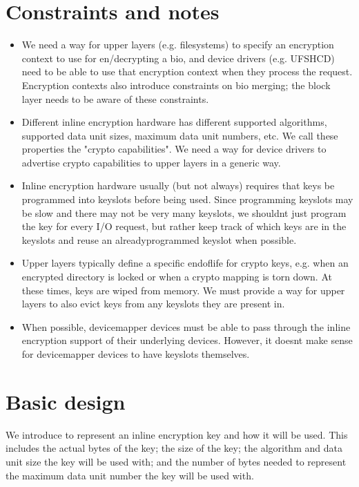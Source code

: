 \documentclass[a4paper,11pt,english]{sphinxmanual}
\begin{document}
\section{Constraints and notes}
\label{\detokenize{inline-encryption:constraints-and-notes}}\begin{itemize}
\item {} 
We need a way for upper layers (e.g. filesystems) to specify an encryption
context to use for en/decrypting a bio, and device drivers (e.g. UFSHCD) need
to be able to use that encryption context when they process the request.
Encryption contexts also introduce constraints on bio merging; the block layer
needs to be aware of these constraints.

\item {} 
Different inline encryption hardware has different supported algorithms,
supported data unit sizes, maximum data unit numbers, etc.  We call these
properties the "crypto capabilities".  We need a way for device drivers to
advertise crypto capabilities to upper layers in a generic way.

\item {} 
Inline encryption hardware usually (but not always) requires that keys be
programmed into keyslots before being used.  Since programming keyslots may be
slow and there may not be very many keyslots, we shouldn\textquotesingle{}t just program the
key for every I/O request, but rather keep track of which keys are in the
keyslots and reuse an already\sphinxhyphen{}programmed keyslot when possible.

\item {} 
Upper layers typically define a specific end\sphinxhyphen{}of\sphinxhyphen{}life for crypto keys, e.g.
when an encrypted directory is locked or when a crypto mapping is torn down.
At these times, keys are wiped from memory.  We must provide a way for upper
layers to also evict keys from any keyslots they are present in.

\item {} 
When possible, device\sphinxhyphen{}mapper devices must be able to pass through the inline
encryption support of their underlying devices.  However, it doesn\textquotesingle{}t make
sense for device\sphinxhyphen{}mapper devices to have keyslots themselves.

\end{itemize}


\section{Basic design}
\label{\detokenize{inline-encryption:basic-design}}
We introduce  to represent an inline encryption key and
how it will be used.  This includes the actual bytes of the key; the size of the
key; the algorithm and data unit size the key will be used with; and the number
of bytes needed to represent the maximum data unit number the key will be used
with.
\end{document}
